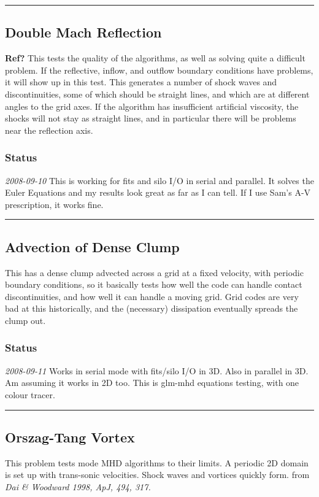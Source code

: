 \documentclass[11pt]{article}
\begin{document}
\vspace{0.4cm} \hrule
\subsection{Double Mach Reflection}
\textbf{Ref?} This tests the quality of the algorithms, as well as
solving quite a difficult problem.  If the reflective, inflow, and
outflow boundary conditions have problems, it will show up in this
test.  This generates a number of shock waves and discontinuities,
some of which should be straight lines, and which are at different
angles to the grid axes.  If the algorithm has insufficient artificial
viscosity, the shocks will not stay as straight lines, and in
particular there will be problems near the reflection axis.
\subsubsection{Status}
\textit{2008-09-10} This is working for fits and silo I/O in serial
and parallel.  It solves the Euler Equations and my results look great
as far as I can tell.  If I use Sam's A-V prescription, it works fine.

\vspace{0.4cm} \hrule
\subsection{Advection of Dense Clump}
This has a dense clump advected across a grid at a fixed velocity,
with periodic boundary conditions, so it basically tests how well the
code can handle contact discontinuities, and how well it can handle a
moving grid.  Grid codes are very bad at this historically, and the
(necessary) dissipation eventually spreads the clump out.
\subsubsection{Status}
\textit{2008-09-11} Works in serial mode with fits/silo I/O in 3D.
Also in parallel in 3D.  Am assuming it works in 2D too.  This is
glm-mhd equations testing, with one colour tracer.

\vspace{0.4cm} \hrule
\subsection{Orszag-Tang Vortex}
This problem tests mode MHD algorithms to their limits.  A periodic 2D
domain is set up with trans-sonic velocities.  Shock waves and
vortices quickly form. from \textit{Dai \& Woodward 1998, ApJ, 494,
317.}
\end{document}
